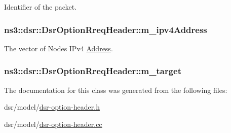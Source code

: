 Identifier of the packet. 

\subsubsection[{\texorpdfstring{m\+\_\+ipv4\+Address}{m_ipv4Address}}]{ ns3\+::dsr\+::\+Dsr\+Option\+Rreq\+Header\+::m\+\_\+ipv4\+Address\hspace{0.3cm}{\ttfamily [private]}}\hypertarget{classns3_1_1dsr_1_1DsrOptionRreqHeader_ac4457c65d46dc4a8fed812c387512d0c}{}\label{classns3_1_1dsr_1_1DsrOptionRreqHeader_ac4457c65d46dc4a8fed812c387512d0c}


The vector of Nodes\textquotesingle{} I\+Pv4 \hyperlink{classns3_1_1Address}{Address}. 

\subsubsection[{\texorpdfstring{m\+\_\+target}{m_target}}]{ ns3\+::dsr\+::\+Dsr\+Option\+Rreq\+Header\+::m\+\_\+target\hspace{0.3cm}{\ttfamily [private]}}\hypertarget{classns3_1_1dsr_1_1DsrOptionRreqHeader_a19bba241260fbfda8df02ee3e74ff4ff}{}\label{classns3_1_1dsr_1_1DsrOptionRreqHeader_a19bba241260fbfda8df02ee3e74ff4ff}


The documentation for this class was generated from the following files\+:\begin{DoxyCompactItemize}
\item 
dsr/model/\hyperlink{dsr-option-header_8h}{dsr-\/option-\/header.\+h}\item 
dsr/model/\hyperlink{dsr-option-header_8cc}{dsr-\/option-\/header.\+cc}\end{DoxyCompactItemize}
